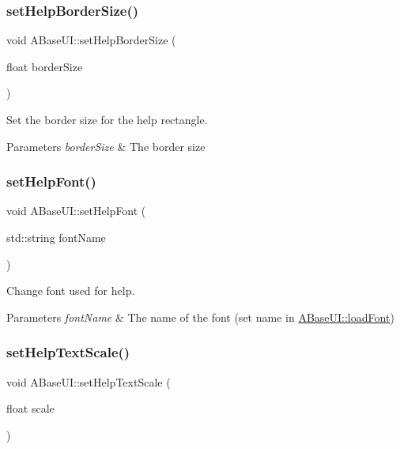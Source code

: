 \subsubsection{\texorpdfstring{set\+Help\+Border\+Size()}{setHelpBorderSize()}}
{\footnotesize\ttfamily void A\+Base\+U\+I\+::set\+Help\+Border\+Size (\begin{DoxyParamCaption}\item[{float}]{border\+Size }\end{DoxyParamCaption})\hspace{0.3cm}{\ttfamily [static]}}



Set the border size for the help rectangle. 


\begin{DoxyParams}{Parameters}
{\em border\+Size} & The border size \\
\hline
\end{DoxyParams}
\mbox{\label{class_a_base_u_i_a2e638887f2b479e3e6eda17473651a4c}} 
\subsubsection{\texorpdfstring{set\+Help\+Font()}{setHelpFont()}}
{\footnotesize\ttfamily void A\+Base\+U\+I\+::set\+Help\+Font (\begin{DoxyParamCaption}\item[{std\+::string}]{font\+Name }\end{DoxyParamCaption})\hspace{0.3cm}{\ttfamily [static]}}



Change font used for help. 


\begin{DoxyParams}{Parameters}
{\em font\+Name} & The name of the font (set name in \hyperlink{class_a_base_u_i_a0f874aa68f35600ea0a5396aedcb73a0}{A\+Base\+U\+I\+::load\+Font}) \\
\hline
\end{DoxyParams}
\mbox{\label{class_a_base_u_i_a426b0f7983ea5942b29c678f9fd1c098}} 
\subsubsection{\texorpdfstring{set\+Help\+Text\+Scale()}{setHelpTextScale()}}
{\footnotesize\ttfamily void A\+Base\+U\+I\+::set\+Help\+Text\+Scale (\begin{DoxyParamCaption}\item[{float}]{scale }\end{DoxyParamCaption})\hspace{0.3cm}{\ttfamily [static]}}



